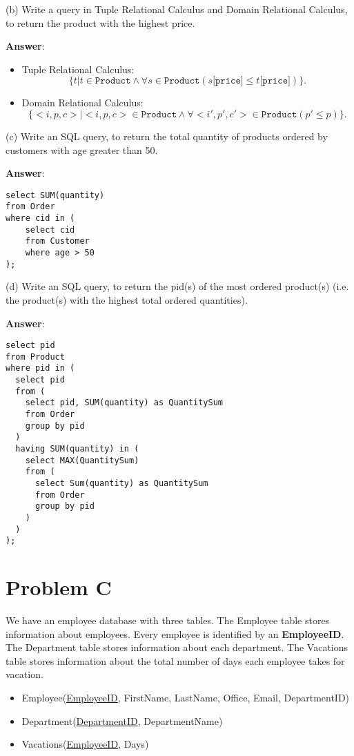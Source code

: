 \documentclass{article}
\begin{document}
(b) Write a query in Tuple Relational Calculus and Domain Relational Calculus, to return the product with the highest price.

{\bf Answer}: 
\begin{itemize}
\item Tuple Relational Calculus:
$$\{t | t \in \texttt{Product} \wedge \forall s \in \texttt{Product} (s\texttt{[price]} \leq t\texttt{[price]})\}.$$
\item Domain Relational Calculus:
$$\{<i, p, c> | <i, p, c> \in \texttt{Product} \wedge \forall <i', p', c'> \in \texttt{Product} (p' \leq p)\}.$$
\end{itemize}

(c) Write an SQL query, to return the total quantity of products ordered by customers with age greater than 50.

{\bf Answer}:
\begin{verbatim}
select SUM(quantity)
from Order
where cid in (
    select cid
    from Customer
    where age > 50
);
\end{verbatim}

(d) Write an SQL query, to return the pid(s) of the most ordered product(s) (i.e. the product(s) with the highest total ordered quantities).

{\bf Answer}: 
\begin{verbatim}
select pid
from Product
where pid in (
  select pid
  from (
    select pid, SUM(quantity) as QuantitySum
    from Order
    group by pid
  )
  having SUM(quantity) in (
    select MAX(QuantitySum)
    from (
      select Sum(quantity) as QuantitySum
      from Order
      group by pid
    )
  )
);
\end{verbatim}

\section{Problem C}
We have an employee database with three tables. The Employee table stores information about employees. Every employee is identified by an {\bf EmployeeID}. The Department table stores information about each department. The Vacations table stores information about the total number of days each employee takes for vacation.
\begin{itemize}
\item Employee(\underline{EmployeeID}, FirstName, LastName, Office, Email, DepartmentID)
\item Department(\underline{DepartmentID}, DepartmentName)
\item Vacations(\underline{EmployeeID}, Days)
\end{itemize}
\end{document}

